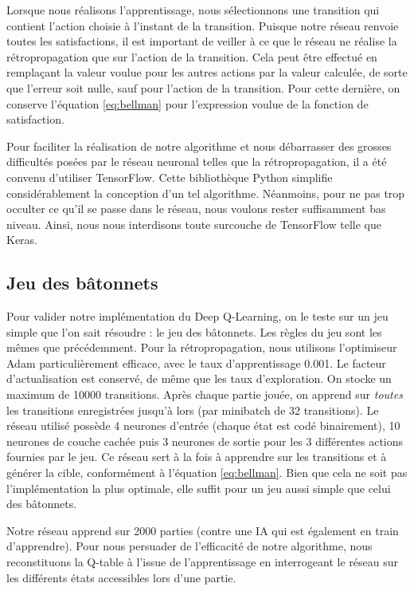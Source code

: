 Lorsque nous réalisons l'apprentissage, nous sélectionnons une transition qui contient l'action choisie à l'instant de la transition. Puisque notre réseau renvoie
toutes les satisfactions, il est important de veiller à ce que le réseau ne réalise la rétropropagation que sur l'action de la transition. Cela peut être 
effectué en remplaçant la valeur voulue pour les autres actions par la valeur calculée, de sorte que l'erreur soit nulle, sauf pour l'action de la transition.
Pour cette dernière, on conserve l'équation \ref{eq:bellman} pour l'expression voulue de la fonction de satisfaction.

Pour faciliter la réalisation de notre algorithme et nous débarrasser des grosses difficultés posées par le réseau neuronal telles que la rétropropagation, il 
a été convenu d'utiliser TensorFlow. Cette bibliothèque Python simplifie considérablement la conception d'un tel algorithme. Néanmoins, pour ne pas trop occulter 
ce qu'il se passe dans le réseau, nous voulons rester suffisamment bas niveau. Ainsi, nous nous interdisons toute surcouche de TensorFlow telle que Keras.


\subsection{Jeu des bâtonnets}

Pour valider notre implémentation du Deep Q-Learning, on le teste sur un jeu simple que l'on sait résoudre : le jeu des bâtonnets. Les règles du jeu sont les mêmes 
que précédemment. Pour la rétropropagation, nous utilisons l'optimiseur Adam particulièrement efficace, avec le taux d'apprentissage 0.001. Le facteur d'actualisation
est conservé, de même que les taux d'exploration. On stocke un maximum de 10000 transitions. Après chaque partie jouée, on apprend sur \emph{toutes} les transitions
enregistrées jusqu'à lors (par minibatch de 32 transitions). Le réseau utilisé possède 4 neurones d'entrée (chaque état est codé binairement), 10 neurones de couche cachée
puis 3 neurones de sortie pour les 3 différentes actions fournies par le jeu. Ce réseau sert à la fois à apprendre sur les transitions et à générer la cible, 
conformément à l'équation \ref{eq:bellman}. Bien que cela ne soit pas l'implémentation la plus optimale, elle suffit pour un jeu aussi simple que celui des bâtonnets.

Notre réseau apprend sur 2000 parties (contre une IA qui est également en train d'apprendre). Pour nous persuader de l'efficacité de notre algorithme, nous reconstituons
la Q-table à l'issue de l'apprentissage en interrogeant le réseau sur les différents états accessibles lors d'une partie. 

